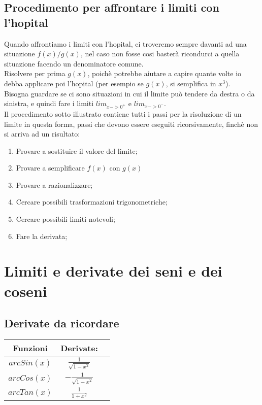 \documentclass[11pt]{article}
\begin{document}
\subsection{Procedimento per affrontare i limiti con l'hopital}
Quando affrontiamo i limiti con l'hopital, ci troveremo sempre davanti ad una situazione 
$f(x)/g(x)$, nel caso non fosse cosi basterà ricondurci a quella situazione facendo un 
denominatore comune.\\
Risolvere per prima $g(x)$, poichè potrebbe aiutare a capire quante volte io debba applicare poi 
l'hopital (per esempio se $g(x)$, si semplifica in $x^{3}$).\\
Bisogna guardare se ci sono situazioni in cui il limite può tendere da destra o da sinistra, 
e quindi fare i limiti $lim_{x->0^{+}}$ e $lim_{x->0^{-}}$.\\
Il procedimento sotto illustrato contiene tutti i passi per la risoluzione di un limite in questa 
forma, passi che devono essere eseguiti ricorsivamente, finchè non si arriva ad un risultato:\\
\begin{enumerate}
    \item Provare a sostituire il valore del limite;
    \item Provare a semplificare $f(x)$ con $g(x)$
    \item Provare a razionalizzare;
    \item Cercare possibili trasformazioni trigonometriche;
    \item Cercare possibili limiti notevoli;
    \item Fare la derivata;
\end{enumerate}

\section{Limiti e derivate dei seni e dei coseni}

\subsection{Derivate da ricordare}
\begin{center}
 \begin{tabular}{|c|c|c|}
 \hline
 Funzioni & Derivate:\\
 \hline \hline
 $arcSin(x)$ & $\frac{1}{\sqrt{1-x^{2}}}$\\
 \hline
 $arcCos(x)$ & $-\frac{1}{\sqrt{1-x^{2}}}$\\
 \hline
 $arcTan(x)$ & $\frac{1}{1+x^{2}}$\\
 \hline
 \end{tabular}
\end{center}
\end{document}
